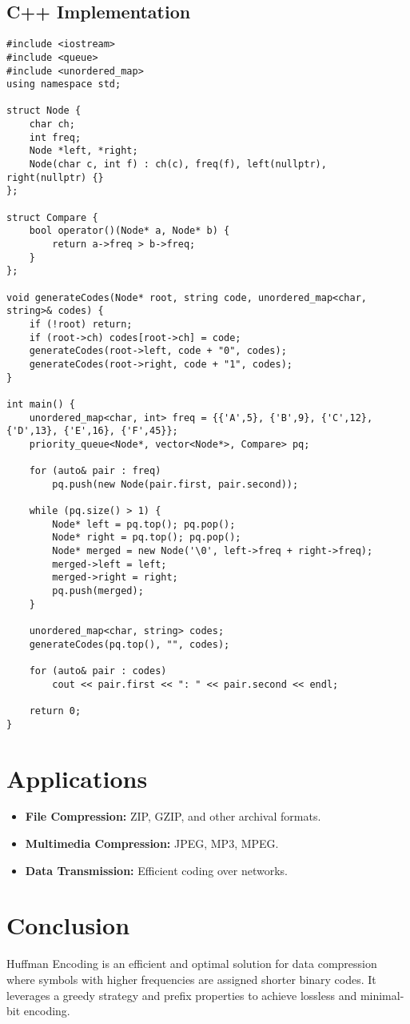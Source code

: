 \documentclass[14pt]{extarticle}
\begin{document}
\newpage
\subsection{C++ Implementation}
\begin{lstlisting}[style=cpp, caption={Huffman Encoding in C++}]
#include <iostream>
#include <queue>
#include <unordered_map>
using namespace std;

struct Node {
    char ch;
    int freq;
    Node *left, *right;
    Node(char c, int f) : ch(c), freq(f), left(nullptr), right(nullptr) {}
};

struct Compare {
    bool operator()(Node* a, Node* b) {
        return a->freq > b->freq;
    }
};

void generateCodes(Node* root, string code, unordered_map<char, string>& codes) {
    if (!root) return;
    if (root->ch) codes[root->ch] = code;
    generateCodes(root->left, code + "0", codes);
    generateCodes(root->right, code + "1", codes);
}

int main() {
    unordered_map<char, int> freq = {{'A',5}, {'B',9}, {'C',12}, {'D',13}, {'E',16}, {'F',45}};
    priority_queue<Node*, vector<Node*>, Compare> pq;

    for (auto& pair : freq)
        pq.push(new Node(pair.first, pair.second));

    while (pq.size() > 1) {
        Node* left = pq.top(); pq.pop();
        Node* right = pq.top(); pq.pop();
        Node* merged = new Node('\0', left->freq + right->freq);
        merged->left = left;
        merged->right = right;
        pq.push(merged);
    }

    unordered_map<char, string> codes;
    generateCodes(pq.top(), "", codes);

    for (auto& pair : codes)
        cout << pair.first << ": " << pair.second << endl;

    return 0;
}
\end{lstlisting}

\section{Applications}
\begin{itemize}
    \item \textbf{File Compression:} ZIP, GZIP, and other archival formats.
    \item \textbf{Multimedia Compression:} JPEG, MP3, MPEG.
    \item \textbf{Data Transmission:} Efficient coding over networks.
\end{itemize}

\section{Conclusion}
Huffman Encoding is an efficient and optimal solution for data compression where symbols with higher frequencies are assigned shorter binary codes. It leverages a greedy strategy and prefix properties to achieve lossless and minimal-bit encoding.
\end{document}
